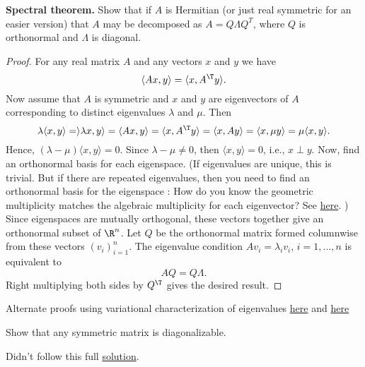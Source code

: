 \begin{exercise} \label{exer:spectral_thrm}
\textbf{Spectral theorem.} Show that if $A$ is Hermitian (or just real symmetric for an easier version) that $A$ may be decomposed as $A = Q\Lambda Q^T$, where $Q$ is orthonormal and $\Lambda$ is diagonal. 
\end{exercise}

\begin{solution}
\begin{proof}
For any real matrix $A$ and any vectors $x$ and $y$ we have
$$
\langle Ax, y\rangle = \langle x, A^\T y\rangle.
$$
Now assume that $A$ is symmetric and $x$ and $y$ are eigenvectors of $A$ corresponding to distinct eigenvalues $\lambda$ and $\mu$. Then 
$$
\lambda \langle x, y\rangle = \rangle \lambda x, y\rangle = \langle Ax, y\rangle = \langle x, A^\T y\rangle = \langle x, A y\rangle = \langle x, \mu y \rangle = \mu\langle x, y \rangle.
$$
Hence, $(\lambda - \mu)\langle x, y\rangle = 0$. Since $\lambda - \mu \not= 0$, then $\langle x, y\rangle = 0$, i.e., $x \perp y$. 
Now, find an orthonormal basis for each eigenspace. (If eigenvalues are unique, this is trivial. But if there are repeated eigenvalues, then you need to find an orthonormal basis for the eigenspace : How do you know the geometric multiplicity matches the algebraic multiplicity for each eigenvector? See \href{https://math.stackexchange.com/questions/393149/for-a-symmetric-matrix-the-geometric-and-algebraic-multiplicities-are-equal}{here}. ) Since eigenspaces are mutually orthogonal, these vectors together give an orthonormal subset of $\R^n$. Let $Q$ be the orthonormal matrix formed columnwise from these vectors $(v_i)_{i=1}^n$. The eigenvalue condition $Av_i = \lambda_i v_i$, $i=1,\ldots,n$ is equivalent to
$$
AQ = Q\Lambda. 
$$
Right multiplying both sides by $Q^\T$ gives the desired result. 
\end{proof}

Alternate proofs using variational characterization of eigenvalues \href{https://mmids-textbook.github.io/chap04_specgraph/03_extremal/roch-mmids-specgraph-extremal.html}{here} and \href{https://terrytao.wordpress.com/2010/01/12/254a-notes-3a-eigenvalues-and-sums-of-hermitian-matrices/}{here}
\end{solution}

\begin{exercise}
Show that any symmetric matrix is diagonalizable.
\end{exercise}

\begin{solution}
Didn't follow this full \href{https://math.stackexchange.com/questions/482599/why-are-real-symmetric-matrices-diagonalizable}{solution}. 
\end{solution}

